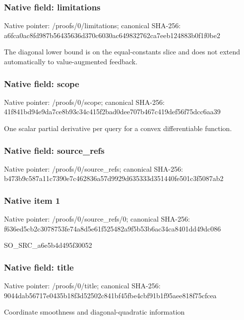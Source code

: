 \documentclass[10pt,a4paper]{article}
\begin{document}
\subsubsection{Native field: limitations}
Native pointer: /proofs/0/limitations; canonical SHA-256: a6fca0ac8fd987b56435636d370c6030ac649832762ca7eeb124883b0f1f0be2

\begingroup\raggedright\sloppy The diagonal lower bound is on the equal-constants slice and does not extend automatically to value-augmented feedback.\par\endgroup

\subsubsection{Native field: scope}
Native pointer: /proofs/0/scope; canonical SHA-256: 41f841bd94e9da7ce8b93c34c415f2bad0dee707b467c419def56f75dcc6aa39

\begingroup\raggedright\sloppy One scalar partial derivative per query for a convex differentiable function.\par\endgroup

\subsubsection{Native field: source\_\allowbreak{}refs}
Native pointer: /proofs/0/source\_\allowbreak{}refs; canonical SHA-256: b473b9c587a11c7390e7c462836a57d9929d635333d351440fe501c3f5087ab2

\subsubsection{Native item 1}
Native pointer: /proofs/0/source\_\allowbreak{}refs/0; canonical SHA-256: f636ed5cb2c3078753fe74a8d5e61f525482a9f5b53b6ac34ca8401dd49dc086

\begingroup\raggedright\sloppy SO\_\allowbreak{}SRC\_\allowbreak{}a6e5b4d495f30052\par\endgroup

\subsubsection{Native field: title}
Native pointer: /proofs/0/title; canonical SHA-256: 9044dab56717e0435b18f3d52502c841bf45fbe4cbf91b1f95aee818f75cfcea

\begingroup\raggedright\sloppy Coordinate smoothness and diagonal-quadratic information\par\endgroup
\end{document}

